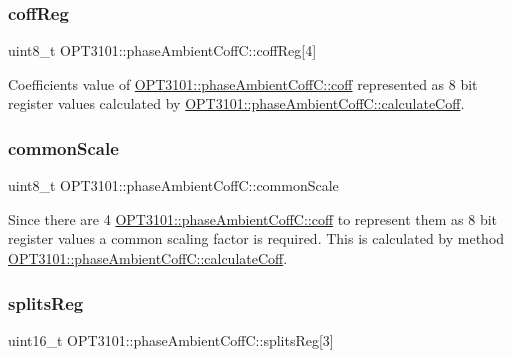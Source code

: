 \subsubsection{\texorpdfstring{coff\+Reg}{coffReg}}
{\footnotesize\ttfamily uint8\+\_\+t O\+P\+T3101\+::phase\+Ambient\+Coff\+C\+::coff\+Reg\mbox{[}4\mbox{]}}



Coefficients value of \mbox{\hyperlink{class_o_p_t3101_1_1phase_ambient_coff_c_af655f6704c4b3901b82a913f8a047258}{O\+P\+T3101\+::phase\+Ambient\+Coff\+C\+::coff}} represented as 8 bit register values calculated by \mbox{\hyperlink{class_o_p_t3101_1_1phase_ambient_coff_c_ac8f4dfff191b0adc7be044f39500e242}{O\+P\+T3101\+::phase\+Ambient\+Coff\+C\+::calculate\+Coff}}. 

\mbox{\label{class_o_p_t3101_1_1phase_ambient_coff_c_abed8ff9971976201638badbda9fd4543}} 
\subsubsection{\texorpdfstring{common\+Scale}{commonScale}}
{\footnotesize\ttfamily uint8\+\_\+t O\+P\+T3101\+::phase\+Ambient\+Coff\+C\+::common\+Scale}



Since there are 4 \mbox{\hyperlink{class_o_p_t3101_1_1phase_ambient_coff_c_af655f6704c4b3901b82a913f8a047258}{O\+P\+T3101\+::phase\+Ambient\+Coff\+C\+::coff}} to represent them as 8 bit register values a common scaling factor is required. This is calculated by method \mbox{\hyperlink{class_o_p_t3101_1_1phase_ambient_coff_c_ac8f4dfff191b0adc7be044f39500e242}{O\+P\+T3101\+::phase\+Ambient\+Coff\+C\+::calculate\+Coff}}. 

\mbox{\label{class_o_p_t3101_1_1phase_ambient_coff_c_a5a2e9d6a0622f02024eaa8a1d2ec0011}} 
\subsubsection{\texorpdfstring{splits\+Reg}{splitsReg}}
{\footnotesize\ttfamily uint16\+\_\+t O\+P\+T3101\+::phase\+Ambient\+Coff\+C\+::splits\+Reg\mbox{[}3\mbox{]}}



